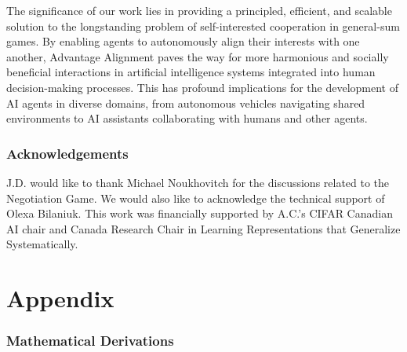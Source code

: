 \documentclass{article} \usepackage{iclr2025_conference,times}
\begin{document}
The significance of our work lies in providing a principled, efficient, and scalable solution to the longstanding problem of self-interested cooperation in general-sum games. By enabling agents to autonomously align their interests with one another, Advantage Alignment paves the way for more harmonious and socially beneficial interactions in artificial intelligence systems integrated into human decision-making processes. This has profound implications for the development of AI agents in diverse domains, from autonomous vehicles navigating shared environments to AI assistants collaborating with humans and other agents.

\section{Acknowledgements}
J.D. would like to thank Michael Noukhovitch for the discussions related to the Negotiation Game. We would also like to acknowledge the technical support of Olexa Bilaniuk. This work was financially supported by  A.C.'s CIFAR Canadian AI chair and Canada Research Chair in Learning Representations that Generalize
Systematically. 


\doparttoc \faketableofcontents \part{} \newpage

\appendix
{}
\part{Appendix} 

\parttoc

\newpage

\section{Mathematical Derivations}
\end{document}
